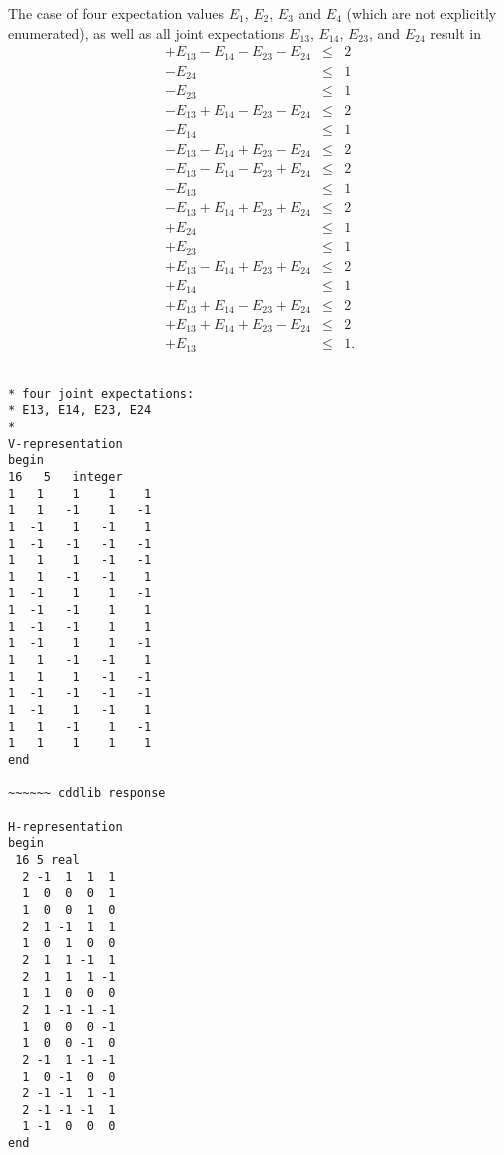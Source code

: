 \documentclass[%
 showpacs,
 showkeys,
 preprintnumbers,
 amsmath,amssymb,
 aps,
  pra,
  longbibliography,
 floatfix,
 ]{revtex4-1}
\begin{document}
The case of four expectation values
$E_1$, $E_2$, $E_3$  and $E_4$ (which are not explicitly enumerated),
as well as all joint expectations $E_{13}$, $E_{14}$, $E_{23}$, and $E_{24}$
result in
\begin{eqnarray}
   + E_{13} - E_{14} - E_{23} - E_{24}       &\le&      2    \\
                              - E_{24}       &\le&      1    \\
                     - E_{23}                &\le&      1    \\
   - E_{13} + E_{14} - E_{23} - E_{24}       &\le&      2    \\
            - E_{14}                         &\le&      1    \\
   - E_{13} - E_{14} + E_{23} - E_{24}       &\le&      2    \\
   - E_{13} - E_{14} - E_{23} + E_{24}       &\le&      2    \\
   - E_{13}                                  &\le&      1    \\
   - E_{13} + E_{14} + E_{23} + E_{24}       &\le&      2    \\
                              + E_{24}       &\le&      1    \\
                     + E_{23}                &\le&      1    \\
   + E_{13} - E_{14} + E_{23} + E_{24}       &\le&      2    \\
            + E_{14}                         &\le&      1    \\
   + E_{13} + E_{14} - E_{23} + E_{24}       &\le&      2    \\
   + E_{13} + E_{14} + E_{23} - E_{24}       &\le&      2    \\
   + E_{13}                                  &\le&      1
.
\label{2017-b-2-2-e-i}
\end{eqnarray}

{ \begin{lstlisting}[backgroundcolor=\color{yellow!10},framerule=0pt,breaklines=true, frame=tb]

* four joint expectations:
* E13, E14, E23, E24
*
V-representation
begin
16   5   integer
1   1    1    1    1
1   1   -1    1   -1
1  -1    1   -1    1
1  -1   -1   -1   -1
1   1    1   -1   -1
1   1   -1   -1    1
1  -1    1    1   -1
1  -1   -1    1    1
1  -1   -1    1    1
1  -1    1    1   -1
1   1   -1   -1    1
1   1    1   -1   -1
1  -1   -1   -1   -1
1  -1    1   -1    1
1   1   -1    1   -1
1   1    1    1    1
end

~~~~~~ cddlib response

H-representation
begin
 16 5 real
  2 -1  1  1  1
  1  0  0  0  1
  1  0  0  1  0
  2  1 -1  1  1
  1  0  1  0  0
  2  1  1 -1  1
  2  1  1  1 -1
  1  1  0  0  0
  2  1 -1 -1 -1
  1  0  0  0 -1
  1  0  0 -1  0
  2 -1  1 -1 -1
  1  0 -1  0  0
  2 -1 -1  1 -1
  2 -1 -1 -1  1
  1 -1  0  0  0
end

\end{lstlisting}  }
\end{document}
